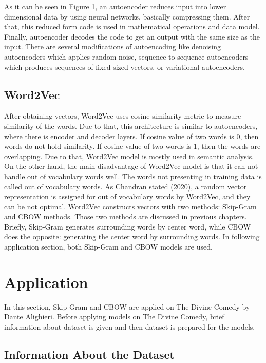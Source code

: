 \documentclass[man]{apa7}
\begin{document}
As it can be seen in Figure 1, an autoencoder reduces input into lower dimensional data by using neural networks, basically compressing them. After that, this reduced form code is used in mathematical operations and data model. Finally, autoencoder decodes the code to get an output with the same size as the input. There are several modifications of autoencoding like denoising autoencoders which applies random noise, sequence-to-sequence autoencoders which produces sequences of fixed sized vectors, or variational autoencoders.

\subsection{Word2Vec}

After obtaining vectors, Word2Vec uses cosine similarity metric to measure similarity of the words. Due to that, this architecture is similar to autoencoders, where there is encoder and decoder layers. If cosine value of two words is 0, then words do not hold similarity. If cosine value of two words  is 1, then the words are overlapping. Due to that, Word2Vec model is mostly used in semantic analysis. On the other hand, the main disadvantage of Word2Vec model is that it can not handle out of vocabulary words well. The words not presenting in training data is called out of vocabulary words.  As Chandran stated (2020), a random vector representation is assigned for out of vocabulary words by Word2Vec, and they can be not optimal. Word2Vec constructs vectors with two methods: Skip-Gram and CBOW methods. Those two methods are discussed in previous chapters. Briefly, Skip-Gram generates surrounding words by center word, while CBOW does the opposite: generating the center word by surrounding words. In following application section, both Skip-Gram and CBOW models are used.

\section{Application}

In this section, Skip-Gram and CBOW are applied on The Divine Comedy by Dante Alighieri. Before applying models on The Divine Comedy, brief information about dataset is given and then dataset is prepared for the models.

\subsection{Information About the Dataset}
\end{document}
